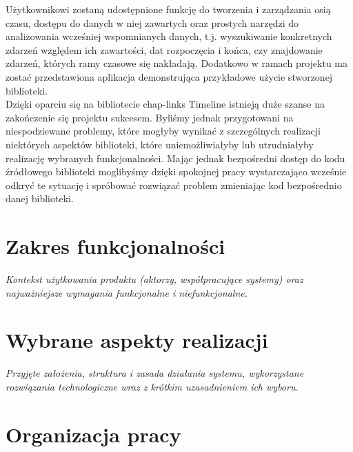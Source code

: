 \documentclass[polish,12pt]{aghthesis}
\begin{document}
Użytkownikowi zostaną udostępnione funkcję do tworzenia i zarządzania osią czasu, dostępu do danych w niej zawartych oraz prostych narzędzi do analizowania wcześniej wspomnianych danych, t.j. wyszukiwanie konkretnych zdarzeń względem ich zawartości, dat rozpoczęcia i końca, czy znajdowanie zdarzeń, których ramy czasowe się nakładają. Dodatkowo w ramach projektu ma zostać przedstawiona aplikacja demonstrująca przykładowe użycie stworzonej biblioteki.
\\

Dzięki oparciu się na bibliotecie chap-links Timeline istnieją duże szanse na zakończenie się projektu sukcesem. Byliśmy jednak przygotowani na niespodziewane problemy, które mogłyby wynikać z szczególnych realizacji niektórych aspektów biblioteki, które uniemożliwiałyby lub utrudniałyby realizację wybranych funkcjonalności. Mając jednak bezpośredni dostęp do kodu źródłowego biblioteki moglibyśmy dzięki spokojnej pracy wystarczająco wcześnie odkryć te sytuację i spróbować rozwiązać problem zmieniając kod bezpośrednio danej biblioteki.


\section{Zakres funkcjonalności}
\label{sec:zakres-funkcjonalnosci}

\emph{Kontekst użytkowania produktu (aktorzy, współpracujące systemy)
  oraz najważniejsze wymagania funkcjonalne i niefunkcjonalne.}

\section{Wybrane aspekty realizacji}
\label{sec:wybrane-aspekty-realizacji}

\emph{Przyjęte założenia, struktura i zasada działania systemu,
  wykorzystane rozwiązania technologiczne wraz z krótkim uzasadnieniem
  ich wyboru.}

\section{Organizacja pracy}
\label{sec:organizacja-pracy}
\end{document}
